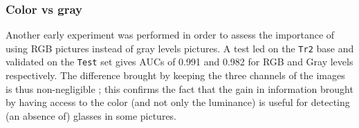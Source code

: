 \documentclass[a4paper]{article}
\begin{document}
        \subsubsection{Color vs gray}
        	Another early experiment was performed in order to assess the importance of using RGB pictures instead of gray levels pictures. A test led on the \texttt{Tr2} base and validated on the \texttt{Test} set gives AUCs of 0.991 and 0.982 for RGB and Gray levels respectively. The difference brought by keeping the three channels of the images is thus non-negligible ; this confirms the fact that the gain in information brought by having access to the color (and not only the luminance) is useful for detecting (an absence of) glasses in some pictures.
            \begin{figure}[H]
            \centering
            \vspace{5pt}
            \end{figure}



\end{document}
